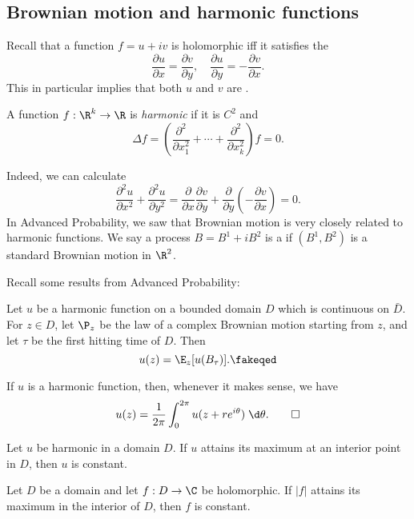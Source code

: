 \documentclass[a4paper]{article}
\begin{document}
\subsection{Brownian motion and harmonic functions}
Recall that a function $f = u + iv$ is holomorphic iff it satisfies the 
\[
  \frac{\partial u}{\partial x} = \frac{\partial v}{\partial y},\quad \frac{\partial u}{\partial y} = - \frac{\partial v}{\partial x}.
\]
This in particular implies that both $u$ and $v$ are .
\begin{defi}
  A function $f: \R^k \to \R$ is \emph{harmonic} if it is $C^2$ and
  \[
    \Delta f = \left(\frac{\partial^2}{\partial x_1^2} + \cdots + \frac{\partial^2}{\partial x_k^2}\right) f = 0.
  \]
\end{defi}
Indeed, we can calculate
\[
  \frac{\partial^2 u}{\partial x^2} + \frac{\partial^2 u}{\partial y^2} = \frac{\partial}{\partial x} \frac{\partial v}{\partial y} + \frac{\partial}{\partial y} \left(- \frac{\partial v}{\partial x}\right) = 0.
\]
In Advanced Probability, we saw that Brownian motion is very closely related to harmonic functions. We say a process $B = B^1 + i B^2$ is a  if $(B^1, B^2)$ is a standard Brownian motion in $\R^2$.

Recall some results from Advanced Probability:
\begin{thm}
  Let $u$ be a harmonic function on a bounded domain $D$ which is continuous on $\bar{D}$. For $z \in D$, let $\P_z$ be the law of a complex Brownian motion starting from $z$, and let $\tau$ be the first hitting time of $D$. Then
  \[
    u(z) = \E_z[u(B_\tau)].\fakeqed
  \]
\end{thm}

\begin{cor}
  If $u$ is a harmonic function, then, whenever it makes sense, we have
  \[
    u(z) = \frac{1}{2\pi} \int_0^{2\pi} u(z + re^{i\theta})\;\d \theta.\qedhere
  \]
\end{cor}
\begin{cor}
  Let $u$ be harmonic in a domain $D$. If $u$ attains its maximum at an interior point in $D$, then $u$ is constant.
\end{cor}

\begin{cor}
  Let $D$ be a domain and let $f: D \to \C$ be holomorphic. If $|f|$ attains its maximum in the interior of $D$, then $f$ is constant.
\end{cor}
\end{document}
